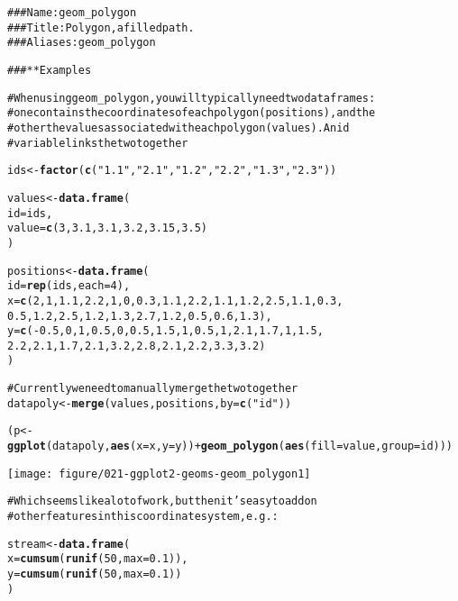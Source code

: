 \documentclass[a4paper,titlepage]{tufte-handout}\usepackage{graphicx, color}
\makeatletter
\def\maxwidth{ %
  \ifdim\Gin@nat@width>\linewidth
    \linewidth
  \else
    \Gin@nat@width
  \fi
}
\newcommand{\hlfunctioncall}[1]{\textcolor[rgb]{0.501960784313725,0,0.329411764705882}{\textbf{#1}}}%
\newcommand{\hlstring}[1]{\textcolor[rgb]{0.6,0.6,1}{#1}}%
\newcommand{\hlcomment}[1]{\textcolor[rgb]{0.180392156862745,0.6,0.341176470588235}{#1}}%
\newenvironment{kframe}{%
 \def\at@end@of@kframe{}%
 \ifinner\ifhmode%
  \def\at@end@of@kframe{\end{minipage}}%
  \begin{minipage}{\columnwidth}%
 \fi\fi%
 \def\FrameCommand##1{\hskip\@totalleftmargin \hskip-\fboxsep
 \colorbox{shadecolor}{##1}\hskip-\fboxsep
     \hskip-\linewidth \hskip-\@totalleftmargin \hskip\columnwidth}%
 \MakeFramed {\advance\hsize-\width
   \@totalleftmargin\z@ \linewidth\hsize
   \@setminipage}}%
 {\par\unskip\endMakeFramed%
 \at@end@of@kframe}
\newenvironment{knitrout}{}{} %
\makeatother
\begin{document}
\begin{knitrout}
\color{fgcolor}\begin{kframe}
\begin{alltt}
\hlcomment{### Name: geom_polygon}
\hlcomment{### Title: Polygon, a filled path.}
\hlcomment{### Aliases: geom_polygon}

\hlcomment{### ** Examples}

\hlcomment{# When using geom_polygon, you will typically need two data frames:}
\hlcomment{# one contains the coordinates of each polygon (positions),  and the}
\hlcomment{# other the values associated with each polygon (values).  An id}
\hlcomment{# variable links the two together}

ids <- \hlfunctioncall{factor}(\hlfunctioncall{c}(\hlstring{"1.1"}, \hlstring{"2.1"}, \hlstring{"1.2"}, \hlstring{"2.2"}, \hlstring{"1.3"}, \hlstring{"2.3"}))

values <- \hlfunctioncall{data.frame}(
  id = ids,
  value = \hlfunctioncall{c}(3, 3.1, 3.1, 3.2, 3.15, 3.5)
)

positions <- \hlfunctioncall{data.frame}(
  id = \hlfunctioncall{rep}(ids, each = 4),
  x = \hlfunctioncall{c}(2, 1, 1.1, 2.2, 1, 0, 0.3, 1.1, 2.2, 1.1, 1.2, 2.5, 1.1, 0.3,
  0.5, 1.2, 2.5, 1.2, 1.3, 2.7, 1.2, 0.5, 0.6, 1.3),
  y = \hlfunctioncall{c}(-0.5, 0, 1, 0.5, 0, 0.5, 1.5, 1, 0.5, 1, 2.1, 1.7, 1, 1.5,
  2.2, 2.1, 1.7, 2.1, 3.2, 2.8, 2.1, 2.2, 3.3, 3.2)
)

\hlcomment{# Currently we need to manually merge the two together}
datapoly <- \hlfunctioncall{merge}(values, positions, by=\hlfunctioncall{c}(\hlstring{"id"}))

(p <- \hlfunctioncall{ggplot}(datapoly, \hlfunctioncall{aes}(x=x, y=y)) + \hlfunctioncall{geom_polygon}(\hlfunctioncall{aes}(fill=value, group=id)))
\end{alltt}
\end{kframe}
\texttt{[image: figure/021-ggplot2-geoms-geom\_polygon1]} 
\begin{kframe}\begin{alltt}

\hlcomment{# Which seems like a lot of work, but then it's easy to add on}
\hlcomment{# other features in this coordinate system, e.g.:}

stream <- \hlfunctioncall{data.frame}(
  x = \hlfunctioncall{cumsum}(\hlfunctioncall{runif}(50, max = 0.1)),
  y = \hlfunctioncall{cumsum}(\hlfunctioncall{runif}(50,max = 0.1))
)


\end{alltt}
\end{kframe}
\end{knitrout}
\end{document}
